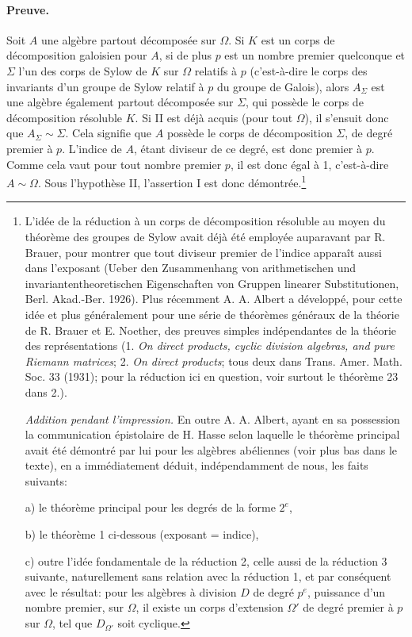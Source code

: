\paragraph{Preuve.}
Soit \(A\) une algèbre partout décomposée sur \(\Omega\). Si \(K\) est un corps de décomposition galoisien pour \(A\), si de plus \(p\) est un nombre premier quelconque et \(\Sigma\) l'un des corps de Sylow de \(K\) sur \(\Omega\) relatifs à \(p\) (c'est-à-dire le corps des invariants d'un groupe de Sylow relatif à \(p\) du groupe de Galois), alors \(A_{\Sigma}\) est une algèbre également partout décomposée sur \(\Sigma\), qui possède le corps de décomposition résoluble \(K\). Si II est déjà acquis (pour tout \(\Omega\)), il s'ensuit donc que \(A_{\Sigma}\sim \Sigma\). Cela signifie que \(A\) possède le corps de décomposition \(\Sigma\), de degré premier à \(p\). L'indice de \(A\), étant diviseur de ce degré, est donc premier à \(p\). Comme cela vaut pour tout nombre premier \(p\), il est donc égal à 1, c'est-à-dire \(A\sim\Omega\). Sous l'hypothèse II, l'assertion I est donc démontrée.\footnote{L'idée de la réduction à un corps de décomposition résoluble au moyen du théorème des groupes de Sylow avait déjà été employée auparavant par R. Brauer, pour montrer que tout diviseur premier de l'indice apparaît aussi dans l'exposant (Ueber den Zusammenhang von arithmetischen und invariantentheoretischen Eigenschaften von Gruppen linearer Substitutionen, Berl. Akad.-Ber. 1926). Plus récemment A. A. Albert a développé, pour cette idée et plus généralement pour une série de théorèmes généraux de la théorie de R. Brauer et E. Noether, des preuves simples indépendantes de la théorie des représentations (1. \emph{On direct products, cyclic division algebras, and pure Riemann matrices}; 2. \emph{On direct products}; tous deux dans Trans. Amer. Math. Soc. 33 (1931); pour la réduction ici en question, voir surtout le théorème 23 dans 2.).

\emph{Addition pendant l'impression.} En outre A. A. Albert, ayant en sa possession la communication épistolaire de H. Hasse selon laquelle le théorème principal avait été démontré par lui pour les algèbres abéliennes (voir plus bas dans le texte), en a immédiatement déduit, indépendamment de nous, les faits suivants:

a) le théorème principal pour les degrés de la forme \(2^e\),

b) le théorème 1 ci-dessous (exposant = indice),

c) outre l'idée fondamentale de la réduction 2, celle aussi de la réduction 3 suivante, naturellement sans relation avec la réduction 1, et par conséquent avec le résultat: pour les algèbres à division \(D\) de degré \(p^e\), puissance d'un nombre premier, sur \(\Omega\), il existe un corps d'extension \(\Omega'\) de degré premier à \(p\) sur \(\Omega\), tel que \(D_{\Omega'}\) soit cyclique.

}
